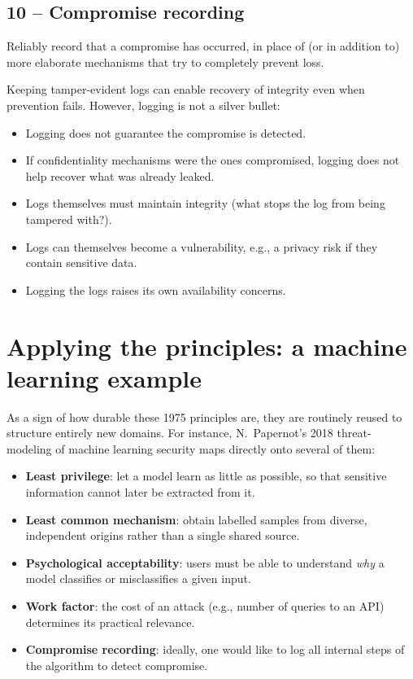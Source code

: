 \subsection{10 -- Compromise recording}

\begin{definition}
Reliably record that a compromise has occurred, in place of (or in addition to) more elaborate mechanisms that try to completely prevent loss.
\end{definition}

Keeping tamper-evident logs can enable recovery of integrity even when prevention fails. However, logging is not a silver bullet:
\begin{itemize}
    \item Logging does not guarantee the compromise is detected.
    \item If confidentiality mechanisms were the ones compromised, logging does not help recover what was already leaked.
    \item Logs themselves must maintain integrity (what stops the log from being tampered with?).
    \item Logs can themselves become a vulnerability, e.g., a privacy risk if they contain sensitive data.
    \item Logging the logs raises its own availability concerns.
\end{itemize}

\section{Applying the principles: a machine learning example}

As a sign of how durable these 1975 principles are, they are routinely reused to structure entirely new domains. For instance, N.\ Papernot's 2018 threat-modeling of machine learning security maps directly onto several of them:
\begin{itemize}
    \item \textbf{Least privilege}: let a model learn as little as possible, so that sensitive information cannot later be extracted from it.
    \item \textbf{Least common mechanism}: obtain labelled samples from diverse, independent origins rather than a single shared source.
    \item \textbf{Psychological acceptability}: users must be able to understand \emph{why} a model classifies or misclassifies a given input.
    \item \textbf{Work factor}: the cost of an attack (e.g., number of queries to an API) determines its practical relevance.
    \item \textbf{Compromise recording}: ideally, one would like to log all internal steps of the algorithm to detect compromise.
\end{itemize}

